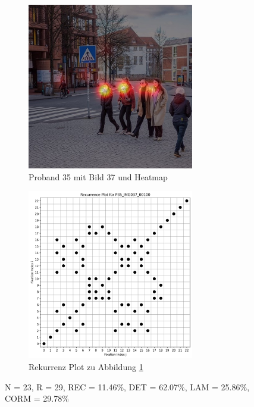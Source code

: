 \documentclass[
    language=german, %
    thesis=seminar, %
    supervisor=postdoc, %
    multiauthor=true, %
    ]{settings/csssa-thesis}
\begin{document}
\begin{figure}[ht]
    \centering
    \begin{subfigure}{0.49\textwidth}
        \centering
        \includegraphics[width=0.8\textwidth]{figures/Bild10.jpg}
        \caption{Proband 35 mit Bild 37 und Heatmap}\label{fig:Bild10a}
    \end{subfigure}
    \begin{subfigure}{0.49\textwidth}
        \centering
        \includegraphics[width=0.8\textwidth]{figures/Bild11.png}
        \caption{Rekurrenz Plot zu Abbildung \ref{fig:Bild10a}}\label{fig:Bild10b}
    \end{subfigure}\label{fig:Bild10}
    \caption{N = 23, R = 29, REC = 11.46\%, DET = 62.07\%, LAM = 25.86\%, CORM = 29.78\%}
\end{figure}
\end{document}
